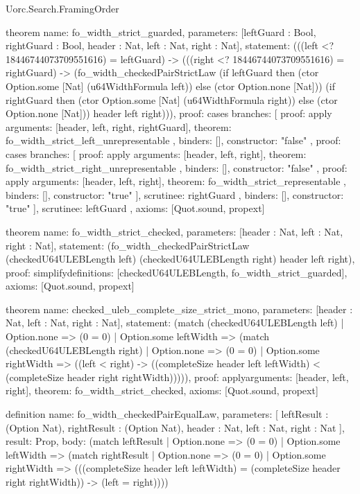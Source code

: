 \begin{lexlean}{Uorc.Search.FramingOrder}
\begin{semanticmodule}
theorem{
  name: fo_width_strict_guarded,
  parameters: [leftGuard : Bool, rightGuard : Bool, header : Nat, left : Nat, right : Nat],
  statement: (((left <? 18446744073709551616) = leftGuard) -> (((right <? 18446744073709551616) = rightGuard) -> (fo_width_checkedPairStrictLaw (if leftGuard then (ctor Option.some [Nat] (u64WidthFormula left)) else (ctor Option.none [Nat])) (if rightGuard then (ctor Option.some [Nat] (u64WidthFormula right)) else (ctor Option.none [Nat])) header left right))),
  proof: cases{
    branches: [
      {
        proof: apply{
          arguments: [header, left, right, rightGuard],
          theorem: fo_width_strict_left_unrepresentable
        },
        binders: [],
        constructor: "false"
      },
      {
        proof: cases{
          branches: [
            {
              proof: apply{
                arguments: [header, left, right],
                theorem: fo_width_strict_right_unrepresentable
              },
              binders: [],
              constructor: "false"
            },
            {
              proof: apply{
                arguments: [header, left, right],
                theorem: fo_width_strict_representable
              },
              binders: [],
              constructor: "true"
            }
          ],
          scrutinee: rightGuard
        },
        binders: [],
        constructor: "true"
      }
    ],
    scrutinee: leftGuard
  },
  axioms: [Quot.sound, propext]
}

theorem{
  name: fo_width_strict_checked,
  parameters: [header : Nat, left : Nat, right : Nat],
  statement: (fo_width_checkedPairStrictLaw (checkedU64ULEBLength left) (checkedU64ULEBLength right) header left right),
  proof: simplify{definitions: [checkedU64ULEBLength, fo_width_strict_guarded]},
  axioms: [Quot.sound, propext]
}

theorem{
  name: checked_uleb_complete_size_strict_mono,
  parameters: [header : Nat, left : Nat, right : Nat],
  statement: (match (checkedU64ULEBLength left)
    | Option.none => (0 = 0)
    | Option.some leftWidth => (match (checkedU64ULEBLength right)
      | Option.none => (0 = 0)
      | Option.some rightWidth => ((left < right) -> ((completeSize header left leftWidth) < (completeSize header right rightWidth))))),
  proof: apply{arguments: [header, left, right], theorem: fo_width_strict_checked},
  axioms: [Quot.sound, propext]
}

definition{
  name: fo_width_checkedPairEqualLaw,
  parameters: [
    leftResult : (Option Nat),
    rightResult : (Option Nat),
    header : Nat,
    left : Nat,
    right : Nat
  ],
  result: Prop,
  body: (match leftResult
    | Option.none => (0 = 0)
    | Option.some leftWidth => (match rightResult
      | Option.none => (0 = 0)
      | Option.some rightWidth => (((completeSize header left leftWidth) = (completeSize header right rightWidth)) -> (left = right))))
}


\end{semanticmodule}
\end{lexlean}
